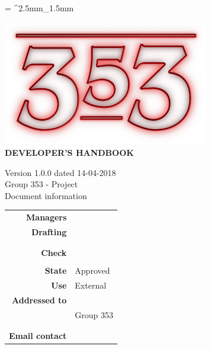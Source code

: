 \documentclass[openany, a4paper, 12pt]{report}
\begin{document}
	
	\tabulinesep = ^2.5mm_1.5mm
	
	\begin{titlepage}
		\centering
		\vfill
		{
			\bfseries
			\vskip2cm
			\includegraphics[width=9cm]{../../common/images/logo.png} \\
			\vfill
			\Huge{DEVELOPER'S HANDBOOK}\\
			\vfill

			\Large Version 1.0.0 dated 14-04-2018\\ 
			\large Group 353 - Project \progetto \\
			\vfill
			\normalsize Document information\\
			\begin{table}[htbp]
				\centering
				\renewcommand\arraystretch{1.2}
				\begin{tabular}{r|l}
					\hline

					\textbf{Managers}	& \Valentina \\
					
					\textbf{Drafting} 		& \Elena \\
											& \Parwinder\\
											& \Mirco \\
											
					\textbf{Check} 			& \Riccardo \\	
											& \Gianluca \\
											
					\textbf{State} 			& Approved\\
					\textbf{Use}			& External\\
					\textbf{Addressed to}   	& \Proponente\\
										& Group 353\\
										& \Vardanega\\
										& \Cardin\\
					
					\textbf{Email contact}	& \mailgroup
				\end{tabular}
			\end{table}
			\vfill
		}    
	\end{titlepage}
	
	\renewcommand{\contentsname}{Index}
	\tableofcontents
	\renewcommand{\listfigurename}{List of Figures}
	\listoffigures
	\newpage
	
	
	
	
	
	
	
	
	
	
\end{document}

